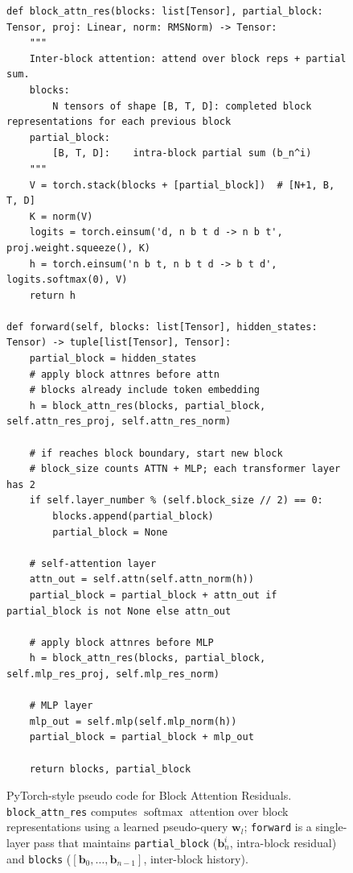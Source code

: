 \renewcommand{\theFancyVerbLine}{\ttfamily\textcolor[rgb]{0.5,0.5,0.5}{\scriptsize\arabic{FancyVerbLine}}}

\begin{figure}[t!]
    \centering
    \let\textit\textup
    \begin{verbatim}
def block_attn_res(blocks: list[Tensor], partial_block: Tensor, proj: Linear, norm: RMSNorm) -> Tensor:
    """
    Inter-block attention: attend over block reps + partial sum.
    blocks:
        N tensors of shape [B, T, D]: completed block representations for each previous block
    partial_block:
        [B, T, D]:    intra-block partial sum (b_n^i)
    """
    V = torch.stack(blocks + [partial_block])  # [N+1, B, T, D]
    K = norm(V)
    logits = torch.einsum('d, n b t d -> n b t', proj.weight.squeeze(), K)
    h = torch.einsum('n b t, n b t d -> b t d', logits.softmax(0), V)
    return h

def forward(self, blocks: list[Tensor], hidden_states: Tensor) -> tuple[list[Tensor], Tensor]:
    partial_block = hidden_states
    # apply block attnres before attn
    # blocks already include token embedding
    h = block_attn_res(blocks, partial_block, self.attn_res_proj, self.attn_res_norm)

    # if reaches block boundary, start new block
    # block_size counts ATTN + MLP; each transformer layer has 2
    if self.layer_number % (self.block_size // 2) == 0:
        blocks.append(partial_block)
        partial_block = None

    # self-attention layer
    attn_out = self.attn(self.attn_norm(h))
    partial_block = partial_block + attn_out if partial_block is not None else attn_out

    # apply block attnres before MLP
    h = block_attn_res(blocks, partial_block, self.mlp_res_proj, self.mlp_res_norm)

    # MLP layer
    mlp_out = self.mlp(self.mlp_norm(h))
    partial_block = partial_block + mlp_out

    return blocks, partial_block
\end{verbatim}
    \caption{PyTorch-style pseudo code for Block Attention Residuals. \texttt{block\_attn\_res} computes $\operatorname{softmax}$ attention over block representations using a learned pseudo-query $\bm{w}_l$; \texttt{forward} is a single-layer pass that maintains \texttt{partial\_block} ($\bm{b}_n^i$, intra-block residual) and \texttt{blocks} ($[\bm{b}_0, \ldots, \bm{b}_{n-1}]$, inter-block history).}
    \label{listing:attnres}
\end{figure}
